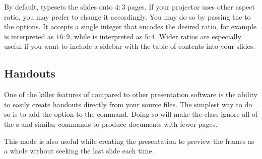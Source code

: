By default,  typesets the slides onto \(4 : 3\) pages. If your
projector uses other aspect ratio, you may prefer to change it accordingly. You
may do so by passing the  to the  options.
It accepts a single integer that encodes the desired ratio, for example
 is interpreted as \(16:9\), while  is interpreted as
\(5:4\). Wider ratios are especially useful if you want to include a sidebar
with the table of contents into your slides.

\subsection{Handouts}

One of the killer features of  compared to other presentation
software is the ability to easily create handouts directly from your source
files. The simplest way to do so is to add the option  to the
 command. Doing so will make the  class ignore
all of the s and similar commands to produce documents with fewer
pages.
This mode is also useful while creating the presentation to preview the frames
as a whole without seeking the last slide each time.


